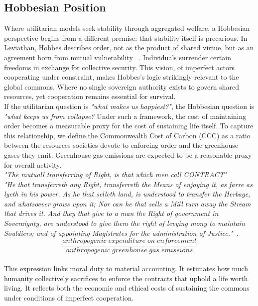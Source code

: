 \documentclass[10pt, oneside]{article}   	%
\begin{document}
\subsection{Hobbesian Position}

Where utilitarian models seek stability through aggregated welfare, a Hobbesian perspective begins from a different premise: that stability itself is precarious.
In Leviathan, Hobbes describes order, not as the product of shared virtue, but as an agreement born from mutual vulnerability ~\cite{th1}.
Individuals surrender certain freedoms in exchange for collective security.
This vision, of imperfect actors cooperating under constraint, makes Hobbes’s logic strikingly relevant to the global commons.
Where no single sovereign authority exists to govern shared resources, yet cooperation remains essential for survival.\\

If the utilitarian question is \emph{"what makes us happiest?"}, the Hobbesian question is \emph{"what keeps us from collapse?}
Under such a framework, the cost of maintaining order becomes a measurable proxy for the cost of sustaining life itself.
To capture this relationship, we define the Commonwealth Cost of Carbon (CCC) as a ratio between the resources societies devote to enforcing order and the greenhouse gases they emit.
Greenhouse gas emissions are expected to be a reasonable proxy for overall activity.\\

\emph{"The mutuall transferring of Right, is that which men call CONTRACT"}\\

\emph{"He that transferreth any Right, transferreth the Means of enjoying it, as farre as lyeth in his power.
As he that selleth land, is understood to transfer the Herbage, and whatsoever grows upon it; Nor can he that sells a Mill turn away the Stream that drives it.
And they that give to a man the Right of government in Soveraignty, are understood to give them the right of levying mony to maintain Souldiers; and of appointing Magistrates for the administration of Justice."}~\cite{th1}.\\

\begin{equation}
	\frac{anthropogenic\; expenditure\; on\; enforcement}{anthropogenic\; greenhouse\; gas\; emissions}
\end{equation}\\

This expression links moral duty to material accounting.
It estimates how much humanity collectively sacrifices to enforce the contracts that uphold a life worth living.
It reflects both the economic and ethical costs of sustaining the commons under conditions of imperfect cooperation.\\
\end{document}
